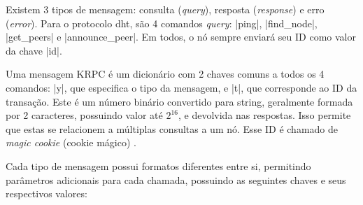 Existem 3 tipos de mensagem: consulta (\emph{query}), resposta (\emph{response}) e erro
(\emph{error}). Para o protocolo \gls*{dht}, são 4 comandos \emph{query}: \bverb|ping|,
\bverb|find_node|, \bverb|get_peers| e \bverb|announce_peer|. Em todos, o nó sempre
enviará seu ID como valor da chave \bverb|id|.

Uma mensagem KRPC é um dicionário com 2 chaves comuns a todos os 4 comandos: \bverb|y|,
que especifica o tipo da mensagem, e \bverb|t|, que corresponde ao ID da transação.
Este é um número binário convertido para \gls*{string}, geralmente formada por 2
caracteres, possuindo valor até $2^{16}$, e devolvida nas respostas. Isso permite que
estas se relacionem a múltiplas consultas a um nó. Esse ID é chamado de \emph{magic
\gls{cookie}} (cookie mágico) \cite{wiki:magic-cookie}.

Cada tipo de mensagem possui formatos diferentes entre si, permitindo parâmetros
adicionais para cada chamada, possuindo as seguintes chaves e seus respectivos valores:

